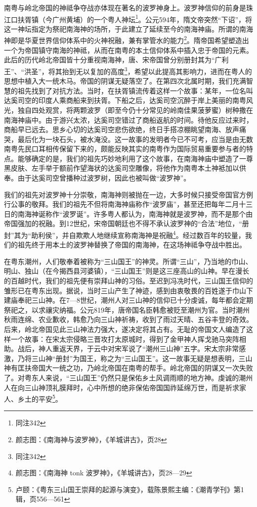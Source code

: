 南粤与岭北帝国的神祗争夺战亦体现在著名的波罗神身上。波罗神信仰的前身是珠江口扶胥镇（今广州黄埔）的一个粤人神坛\footnote{同注342}。公元594年，隋文帝突然“下诏”，将这一神坛指定为祭祀南海神的场所，于此建立了延续至今的南海神庙。所谓的南海神即是华夏世界信仰体系中的火神祝融，兼有掌管水的能力\footnote{颜志图：《南海神与波罗神》，《羊城讲古》，页28}。隋帝国希望塑造出一个为帝国镇守南海的神祗，从而在南粤的本土信仰体系中插入忠于帝国的元素。此后的历代岭北帝国皆十分重视南海神，唐、宋帝国曾分别册封其为“广利王”、“洪圣”，将其抬到无以复加的高度\footnote{同注342}，希望以此提高其影响力，进而在粤人的思想中植入大一统木马。帝国的阴谋无疑落空了。在第四次北属时期，我们充满智慧的祖先找到了对抗方法。当时，在扶胥镇流传着这样一个故事：某年，一位名叫达奚司空的印度人乘商船来到扶胥。下船之后，达奚司空沉醉于岸上美丽的南粤风光，独自四处观赏，将两颗波罗（即至今仍十分常见的岭南佳果菠萝蜜）树种撒在南海神庙中。由于游兴太浓，达奚司空错过了商船返航的时间。待他反应过来时，商船早已远去。思乡心切的达奚司空悲伤欲绝，终日手搭凉棚眺望南海、放声痛哭，最后化为一块石头，被水淹没。这一故事的发明者今已不可考，应当是由无数南粤先民口耳相传保留下来的，颇能反映其实的南粤作为国际贸易重要参与者的特点。能够确定的是，我们的祖先巧妙地利用了这个故事，在南海神庙中塑造了一尊黑皮肤、左手举于额前作望海状的达奚司空雕像，将他作为南粤本土神袛加以供奉。由于达奚司空曾播种过波罗树，因此也被叫做“波罗神”。

我们的祖先对波罗神十分崇敬，南海神则被抛在一边，大多时候只接受帝国官方例行公事的敬拜。我们的祖先不但将南海神庙称作“波罗庙”，甚至还把每年二月十三日的南海神诞称作“波罗诞”。许多粤人都认为，南海神就是波罗神，而不是那个由帝国强加的祝融。到12世纪，宋帝国朝廷也不得不承认波罗神的“合法”地位，“册封”其为“助利侯”，并自欺欺人地继续宣称南海神是祝融\footnote{颜志图：《南海神 tonk 波罗神》，《羊城讲古》，页28—29}。经过数百年的较量，我们的祖先终于用本土的波罗神替换了帝国的南海神，在这场神祗争夺战中胜出。

在粤东潮州，人们敬奉着被称为“三山国王”的神灵。所谓“三山”，乃当地的巾山、明山、独山（在今揭西县河婆镇），“三山国王”则是这三座高山的山神。早在漫长的百越时代，我们的祖先便有崇拜山神的习俗。至迟到冯冼时代，三山国王信仰的雏形已在粤东出现。据说，当时三山产生了神迹，感到由衷敬畏的百姓遂于巾山下建庙奉祀三山神。在7—8世纪，潮州人对三山神的信仰已十分虔诚，每年都会定期祭祀之，以求禳灾纳福。公元819年，唐帝国名臣韩愈被贬至潮州为官。当时潮州秋雨连绵、农业歉收，韩愈乃向三山神祈祷，收到了雨过天晴、五谷丰登的奇效。后来，岭北帝国见此三山神法力强大，遂决定将其占有。无耻的帝国文人编造了这样一个故事：在宋太宗侵略三晋攻打太原城时，得到了金甲神人挥戈驰马突阵相助。战后，神人重返天界，于云中对宋军说了“潮州三山神”五字。宋太宗非常感激，乃将三山神“册封”为国王，称之为“三山国王”。这一故事无疑是想表明，三山神有匡扶帝国大一统之功，乃岭北帝国在南粤的帮手。岭北帝国的阴谋又一次失败了。对粤东人来说，“三山国王”仍然只是保佑乡土风调雨顺的地方神。虔诚的潮州人在向三山神顶礼膜拜时，心中所想的绝非保佑帝国国祚延绵万世，而是祈求家人、乡土的平安\footnote{卢颐：《粤东三山国王崇拜的起源与演变》，载陈景熙主编：《潮青学刊》第1辑，页556—561}。

